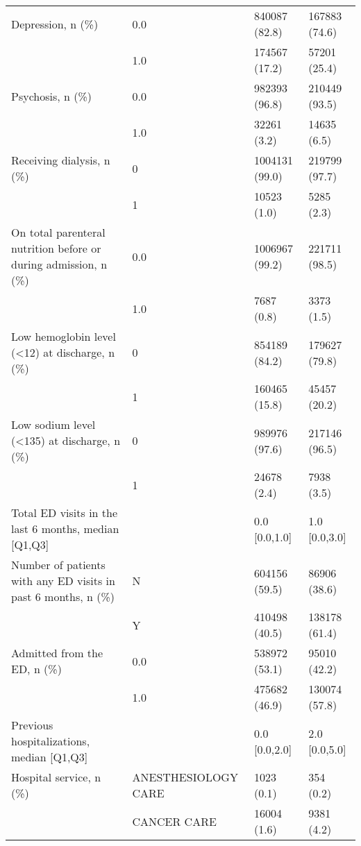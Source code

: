 \begin{tabular}{llll}
Depression, n (\%) & 0.0 &            840087 (82.8) &     167883 (74.6) \\
                                       & 1.0 &            174567 (17.2) &      57201 (25.4) \\
Psychosis, n (\%) & 0.0 &            982393 (96.8) &     210449 (93.5) \\
                                       & 1.0 &              32261 (3.2) &       14635 (6.5) \\
Receiving dialysis, n (\%) & 0 &           1004131 (99.0) &     219799 (97.7) \\
                                       & 1 &              10523 (1.0) &        5285 (2.3) \\
On total parenteral nutrition before or during admission, n (\%) & 0.0 &           1006967 (99.2) &     221711 (98.5) \\
                                       & 1.0 &               7687 (0.8) &        3373 (1.5) \\
Low hemoglobin level (<12) at discharge, n (\%) & 0 &            854189 (84.2) &     179627 (79.8) \\
                                       & 1 &            160465 (15.8) &      45457 (20.2) \\
Low sodium level (<135) at discharge, n (\%) & 0 &            989976 (97.6) &     217146 (96.5) \\
                                       & 1 &              24678 (2.4) &        7938 (3.5) \\
Total ED visits in the last 6 months, median [Q1,Q3] &   &            0.0 [0.0,1.0] &     1.0 [0.0,3.0] \\
Number of patients with any ED visits in past 6 months, n (\%) & N &            604156 (59.5) &      86906 (38.6) \\
                                       & Y &            410498 (40.5) &     138178 (61.4) \\
Admitted from the ED, n (\%) & 0.0 &            538972 (53.1) &      95010 (42.2) \\
                                       & 1.0 &            475682 (46.9) &     130074 (57.8) \\
Previous hospitalizations, median [Q1,Q3] &   &            0.0 [0.0,2.0] &     2.0 [0.0,5.0] \\
Hospital service, n (\%) & ANESTHESIOLOGY CARE &               1023 (0.1) &         354 (0.2) \\
                                       & CANCER CARE &              16004 (1.6) &        9381 (4.2) \\

\end{tabular}
